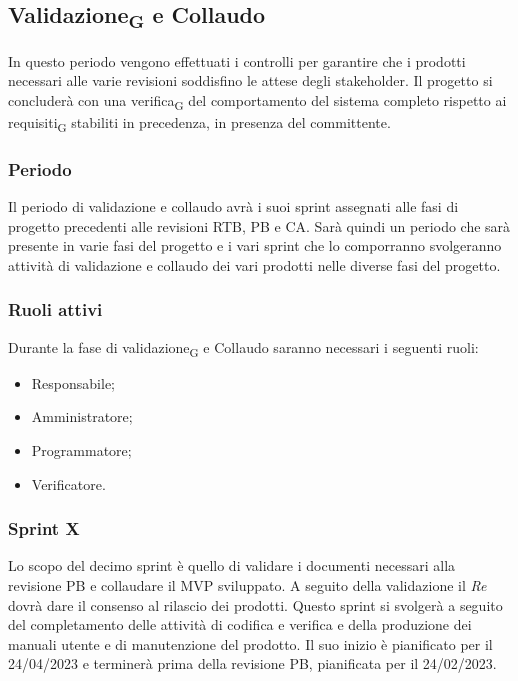 \newpage
\subsection{Validazione\textsubscript{G} e Collaudo}
In questo periodo vengono effettuati i controlli per garantire che i prodotti necessari alle varie revisioni soddisfino le attese degli stakeholder. Il progetto si concluderà con una verifica\textsubscript{G} del comportamento del sistema completo rispetto ai requisiti\textsubscript{G} stabiliti in precedenza, in presenza del committente.

\subsubsection{Periodo}
Il periodo di validazione e collaudo avrà i suoi sprint assegnati alle fasi di progetto precedenti alle revisioni RTB, PB e CA. Sarà quindi un periodo che sarà presente in varie fasi del progetto e i vari sprint che lo comporranno svolgeranno attività di validazione e collaudo dei vari prodotti nelle diverse fasi del progetto.

\subsubsection{Ruoli attivi}
Durante la fase di validazione\textsubscript{G} e Collaudo saranno necessari i seguenti ruoli:
\begin{itemize}
	\item Responsabile;
	\item Amministratore;
	\item Programmatore;
	\item Verificatore.
\end{itemize}

\subsubsection{Sprint X}
Lo scopo del decimo sprint è quello di validare i documenti necessari alla revisione PB e collaudare il MVP sviluppato. A seguito della validazione il \textit{Re} dovrà dare il consenso al rilascio dei prodotti.
Questo sprint si svolgerà a seguito del completamento delle attività di codifica e verifica e della produzione dei manuali utente e di manutenzione del prodotto. Il suo inizio è pianificato per il 24/04/2023 e terminerà prima della revisione PB, pianificata per il 24/02/2023.

